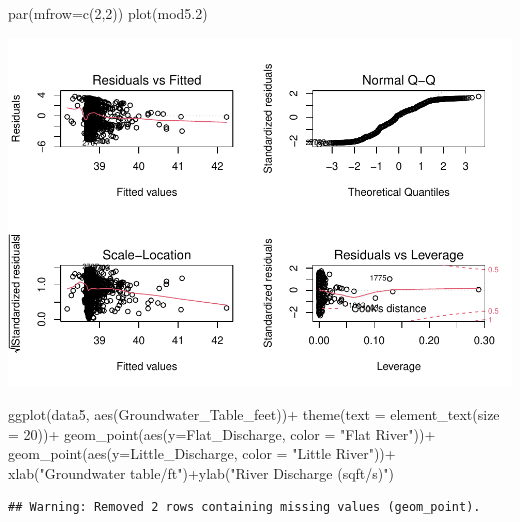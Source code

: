 \documentclass[
  12pt,
]{article}
\newenvironment{Shaded}{\begin{snugshade}}{\end{snugshade}}
\newcommand{\AttributeTok}[1]{\textcolor[rgb]{0.77,0.63,0.00}{#1}}
\newcommand{\DecValTok}[1]{\textcolor[rgb]{0.00,0.00,0.81}{#1}}
\newcommand{\FloatTok}[1]{\textcolor[rgb]{0.00,0.00,0.81}{#1}}
\newcommand{\FunctionTok}[1]{\textcolor[rgb]{0.00,0.00,0.00}{#1}}
\newcommand{\NormalTok}[1]{#1}
\newcommand{\SpecialCharTok}[1]{\textcolor[rgb]{0.00,0.00,0.00}{#1}}
\newcommand{\StringTok}[1]{\textcolor[rgb]{0.31,0.60,0.02}{#1}}
\begin{document}
\begin{Shaded}
\begin{Highlighting}[]
\FunctionTok{par}\NormalTok{(}\AttributeTok{mfrow=}\FunctionTok{c}\NormalTok{(}\DecValTok{2}\NormalTok{,}\DecValTok{2}\NormalTok{))}
\FunctionTok{plot}\NormalTok{(mod5}\FloatTok{.2}\NormalTok{)}
\end{Highlighting}
\end{Shaded}

\includegraphics{Project_files/figure-latex/groundwater and river discharge-1.pdf}

\begin{Shaded}
\begin{Highlighting}[]
\FunctionTok{ggplot}\NormalTok{(data5, }\FunctionTok{aes}\NormalTok{(Groundwater\_Table\_feet))}\SpecialCharTok{+}
  \FunctionTok{theme}\NormalTok{(}\AttributeTok{text =} \FunctionTok{element\_text}\NormalTok{(}\AttributeTok{size =} \DecValTok{20}\NormalTok{))}\SpecialCharTok{+}
  \FunctionTok{geom\_point}\NormalTok{(}\FunctionTok{aes}\NormalTok{(}\AttributeTok{y=}\NormalTok{Flat\_Discharge, }\AttributeTok{color =} \StringTok{"Flat River"}\NormalTok{))}\SpecialCharTok{+}
    \FunctionTok{geom\_point}\NormalTok{(}\FunctionTok{aes}\NormalTok{(}\AttributeTok{y=}\NormalTok{Little\_Discharge, }\AttributeTok{color =} \StringTok{"Little River"}\NormalTok{))}\SpecialCharTok{+}
  \FunctionTok{xlab}\NormalTok{(}\StringTok{"Groundwater table/ft"}\NormalTok{)}\SpecialCharTok{+}\FunctionTok{ylab}\NormalTok{(}\StringTok{"River Discharge (sqft/s)"}\NormalTok{)}
\end{Highlighting}
\end{Shaded}

\begin{verbatim}
## Warning: Removed 2 rows containing missing values (geom_point).
\end{verbatim}
\end{document}
